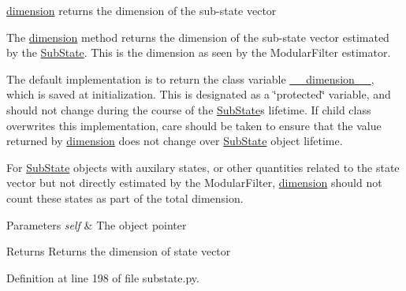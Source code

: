 \hyperlink{classmodest_1_1substates_1_1substate_1_1SubState_ab9027f6d1d7d57c47731612f519b7ee6}{dimension} returns the dimension of the sub-\/state vector 

The \hyperlink{classmodest_1_1substates_1_1substate_1_1SubState_ab9027f6d1d7d57c47731612f519b7ee6}{dimension} method returns the dimension of the sub-\/state vector estimated by the \hyperlink{classmodest_1_1substates_1_1substate_1_1SubState}{Sub\+State}. This is the dimension as seen by the Modular\+Filter estimator.

The default implementation is to return the class variable \hyperlink{classmodest_1_1substates_1_1substate_1_1SubState_a5b1c0756a69da7f293a415c7d2d77843}{\+\_\+\+\_\+dimension\+\_\+\+\_\+}, which is saved at initialization. This is designated as a \char`\"{}protected\char`\"{} variable, and should not change during the course of the \hyperlink{classmodest_1_1substates_1_1substate_1_1SubState}{Sub\+State}\textquotesingle{}s lifetime. If child class overwrites this implementation, care should be taken to ensure that the value returned by \hyperlink{classmodest_1_1substates_1_1substate_1_1SubState_ab9027f6d1d7d57c47731612f519b7ee6}{dimension} does not change over \hyperlink{classmodest_1_1substates_1_1substate_1_1SubState}{Sub\+State} object lifetime.

For \hyperlink{classmodest_1_1substates_1_1substate_1_1SubState}{Sub\+State} objects with auxilary states, or other quantities related to the state vector but not directly estimated by the Modular\+Filter, \hyperlink{classmodest_1_1substates_1_1substate_1_1SubState_ab9027f6d1d7d57c47731612f519b7ee6}{dimension} should not count these states as part of the total dimension.


\begin{DoxyParams}{Parameters}
{\em self} & The object pointer\\
\hline
\end{DoxyParams}
\begin{DoxyReturn}{Returns}
Returns the dimension of state vector 
\end{DoxyReturn}


Definition at line 198 of file substate.\+py.

